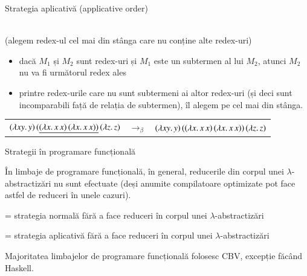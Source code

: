 \documentclass[xcolor=pdftex,romanian,colorlinks]{beamer}
\begin{document}
\begin{frame}[fragile]{Strategia aplicativă (applicative order)}

 \\
(alegem redex-ul cel mai din stânga care nu conține alte redex-uri)

\begin{itemize}
	\item dacă $M_1$ și $M_2$ sunt redex-uri  și $M_1$ este un subtermen al lui $M_2$, atunci $M_2$ {\color{False} nu} va fi următorul redex ales
	\item printre redex-urile care nu sunt subtermeni ai altor redex-uri (și deci sunt incomparabili față de relația de subtermen), îl alegem pe cel mai din stânga.
\end{itemize}

{\footnotesize
\begin{center}
\begin{tabular}{rcl} 
$(\lambda xy.\,y)\, (\underline{(\lambda x.\,x\, x)\, (\lambda x.\,x\, x))}\, (\lambda z.\,z)$ & $\rightarrow_\beta$ &  $(\lambda xy.\,y)\, ((\lambda x.\,x\, x)\, (\lambda x.\,x\, x))\, (\lambda z.\,z)$ \\
\end{tabular}
\end{center}
}

\end{frame}

\begin{frame}[fragile]{Strategii în programare funcțională}

În limbaje de programare funcțională, în general, reducerile din corpul unei $\lambda$-abstractizări nu sunt efectuate (deși anumite compilatoare optimizate pot face astfel de reduceri în unele cazuri).

\medskip
{} = strategia normală fără a face reduceri în corpul unei $\lambda$-abstractizări

\medskip
{} = strategia aplicativă fără a face reduceri în corpul unei $\lambda$-abstractizări

\medskip
Majoritatea limbajelor de programare funcțională folosesc CBV, excepție făcând Haskell.

\end{frame}
\end{document}
